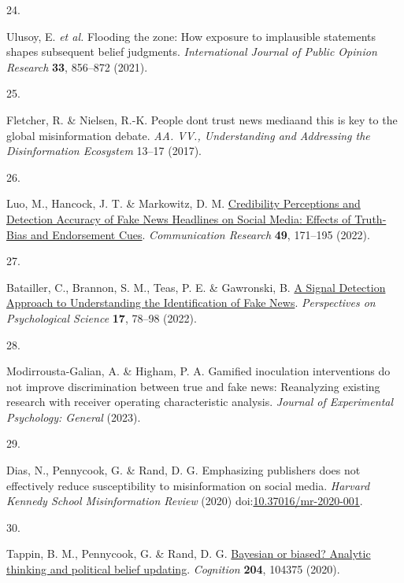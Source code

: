 \documentclass[
  man]{apa6}
\newlength{\cslhangindent}
\newlength{\csllabelwidth}
\newenvironment{CSLReferences}[2] %
 {\begin{list}{}{%
  \setlength{\itemindent}{0pt}
  \setlength{\leftmargin}{0pt}
  \setlength{\parsep}{0pt}
  \ifodd #1
   \setlength{\leftmargin}{\cslhangindent}
   \setlength{\itemindent}{-1\cslhangindent}
  \fi
  \setlength{\itemsep}{#2\baselineskip}}}
 {\end{list}}
\newcommand{\CSLLeftMargin}[1]{\parbox[t]{\csllabelwidth}{\strut#1\strut}}
\newcommand{\CSLRightInline}[1]{\parbox[t]{\linewidth - \csllabelwidth}{\strut#1\strut}}
\begin{document}
\begin{CSLReferences}{0}{0}
\CSLLeftMargin{24. }%
\CSLRightInline{Ulusoy, E. \emph{et al.} Flooding the zone: How exposure to implausible statements shapes subsequent belief judgments. \emph{International Journal of Public Opinion Research} \textbf{33}, 856--872 (2021).}

\CSLLeftMargin{25. }%
\CSLRightInline{Fletcher, R. \& Nielsen, R.-K. People dont trust news media{\textendash}and this is key to the global misinformation debate. \emph{AA. VV., Understanding and Addressing the Disinformation Ecosystem} 13--17 (2017).}

\CSLLeftMargin{26. }%
\CSLRightInline{*Luo, M., Hancock, J. T. \& Markowitz, D. M. \href{https://doi.org/10.1177/0093650220921321}{Credibility Perceptions and Detection Accuracy of Fake News Headlines on Social Media: Effects of Truth-Bias and Endorsement Cues}. \emph{Communication Research} \textbf{49}, 171--195 (2022).}

\CSLLeftMargin{27. }%
\CSLRightInline{Batailler, C., Brannon, S. M., Teas, P. E. \& Gawronski, B. \href{https://doi.org/10.1177/1745691620986135}{A Signal Detection Approach to Understanding the Identification of Fake News}. \emph{Perspectives on Psychological Science} \textbf{17}, 78--98 (2022).}

\CSLLeftMargin{28. }%
\CSLRightInline{Modirrousta-Galian, A. \& Higham, P. A. Gamified inoculation interventions do not improve discrimination between true and fake news: Reanalyzing existing research with receiver operating characteristic analysis. \emph{Journal of Experimental Psychology: General} (2023).}

\CSLLeftMargin{29. }%
\CSLRightInline{*Dias, N., Pennycook, G. \& Rand, D. G. Emphasizing publishers does not effectively reduce susceptibility to misinformation on social media. \emph{Harvard Kennedy School Misinformation Review} (2020) doi:\href{https://doi.org/10.37016/mr-2020-001}{10.37016/mr-2020-001}.}

\CSLLeftMargin{30. }%
\CSLRightInline{Tappin, B. M., Pennycook, G. \& Rand, D. G. \href{https://doi.org/10.1016/j.cognition.2020.104375}{Bayesian or biased? Analytic thinking and political belief updating}. \emph{Cognition} \textbf{204}, 104375 (2020).}


\end{CSLReferences}
\end{document}
